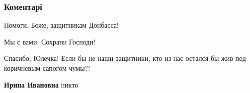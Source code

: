 
 
 
 
 
\subsubsection{Коментарі}

\begin{itemize} %
Помоги, Боже, защитникам Донбасса!

Мы с вами. Сохрани Господи!

Спасибо, Юлечка! Если бы не наши защитники, кто из нас остался бы жив под коричневым сапогом чумы?!

\textbf{Ирина Ивановна} никто
\end{itemize} %
